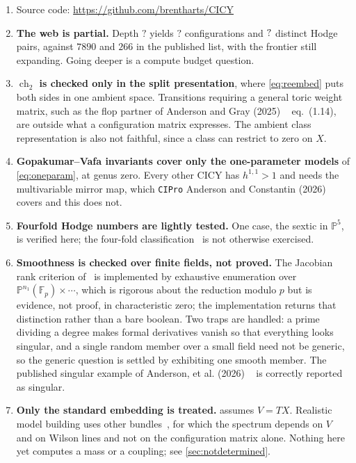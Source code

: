 \documentclass[11pt,a4paper]{article}
\newcommand{\FactDepth}{?}\newcommand{\FactConfigs}{?}
\newcommand{\PP}{\mathbb{P}}
\newcommand{\ch}{\operatorname{ch}}
\theoremstyle{definition}
\begin{document}
\begin{enumerate}[leftmargin=*,itemsep=2pt]

\item Source code: \url{https://github.com/brentharts/CICY}

\item \textbf{The web is partial.} Depth $\FactDepth$ yields $\FactConfigs$
configurations and $?$ distinct Hodge pairs, against $7890$ and
$266$ in the published list, with the frontier still expanding. Going deeper
is a compute budget question.

\item \textbf{$\ch_2$ is checked only in the split presentation}, where
\cref{eq:reembed} puts both sides in one ambient space. Transitions requiring
a general toric weight matrix, such as the flop partner of Anderson and Gray (2025) ~\cite{Anderson2025}
eq.~(1.14), are outside what a configuration matrix expresses. The ambient
class representation is also not faithful, since a class can restrict to zero
on $X$.

\item \textbf{Gopakumar--Vafa invariants cover only the one-parameter models}
of \cref{eq:oneparam}, at genus zero. Every other CICY has $h^{1,1}>1$ and
needs the multivariable mirror map, which \texttt{CIPro} Anderson and Constantin (2026) ~\cite{Anderson2026}
covers and this does not.

\item \textbf{Fourfold Hodge numbers are lightly tested.} One case, the
sextic in $\PP^5$, is verified here; the four-fold
classification~\cite{GrayHauptLukas2013} is not otherwise exercised.

\item \textbf{Smoothness is checked over finite fields, not proved.} The
Jacobian rank criterion of~\cite{Anderson2026} is implemented by exhaustive
enumeration over $\PP^{n_1}(\mathbb{F}_p)\times\cdots$, which is rigorous
about the reduction modulo $p$ but is evidence, not proof, in characteristic
zero; the implementation returns that distinction rather than a bare boolean.
Two traps are handled: a prime dividing a degree makes formal derivatives
vanish so that everything looks singular, and a single random member over a
small field need not be generic, so the generic question is settled by
exhibiting one smooth member. The published singular
example of Anderson, et al. (2026) ~\cite{Anderson2026} is correctly reported as singular.

\item \textbf{Only the standard embedding is treated.}  assumes
$V = TX$. Realistic model building uses other bundles~\cite{Anderson2011,%
Anderson2012}, for which the spectrum depends on $V$ and on Wilson lines and
not on the configuration matrix alone. Nothing here yet computes a mass or a
coupling; see \cref{sec:notdetermined}.
\end{enumerate}
\end{document}
